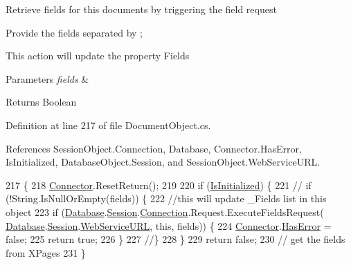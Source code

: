 Retrieve fields for this documents by triggering the field request 

Provide the fields separated by ;

This action will update the property \textquotesingle{}Fields\textquotesingle{}


\begin{DoxyParams}{Parameters}
{\em fields} & \\
\hline
\end{DoxyParams}
\begin{DoxyReturn}{Returns}
Boolean
\end{DoxyReturn}


Definition at line 217 of file Document\+Object.\+cs.



References Session\+Object.\+Connection, Database, Connector.\+Has\+Error, Is\+Initialized, Database\+Object.\+Session, and Session\+Object.\+Web\+Service\+U\+RL.


\begin{DoxyCode}
217                                          \{
218         \mbox{\hyperlink{class_connector}{Connector}}.ResetReturn();
219 
220         \textcolor{keywordflow}{if} (\mbox{\hyperlink{class_document_object_a3b2075b73f38d05091b69decc6ce7992}{IsInitialized}}) \{
221             \textcolor{comment}{// if (!String.IsNullOrEmpty(fields)) \{}
222             \textcolor{comment}{//this will update \_Fields list in this object}
223             \textcolor{keywordflow}{if} (\mbox{\hyperlink{class_document_object_a69d5338c9835f748490323d2950eed09}{Database}}.\mbox{\hyperlink{class_database_object_aa8484162b7d2a7c4c9426bca13c64c07}{Session}}.\mbox{\hyperlink{class_session_object_a014bdbf705a753540e19bfb53030c55c}{Connection}}.Request.ExecuteFieldsRequest(
      \mbox{\hyperlink{class_document_object_a69d5338c9835f748490323d2950eed09}{Database}}.\mbox{\hyperlink{class_database_object_aa8484162b7d2a7c4c9426bca13c64c07}{Session}}.\mbox{\hyperlink{class_session_object_a697c071c812fbf7ad1166b896fb44c16}{WebServiceURL}}, \textcolor{keyword}{this}, fields)) \{
224                 \mbox{\hyperlink{class_connector}{Connector}}.\mbox{\hyperlink{class_connector_a9365777a6b7b711b75bcfa6c4d53e989}{HasError}} = \textcolor{keyword}{false};
225                 \textcolor{keywordflow}{return} \textcolor{keyword}{true};
226             \}
227             \textcolor{comment}{//\}}
228         \}
229         \textcolor{keywordflow}{return} \textcolor{keyword}{false};
230         \textcolor{comment}{// get the fields from XPages}
231     \}
\end{DoxyCode}
\mbox{\label{class_document_object_a8e38704e02850b2480d29d184ae2c0e0}} 
